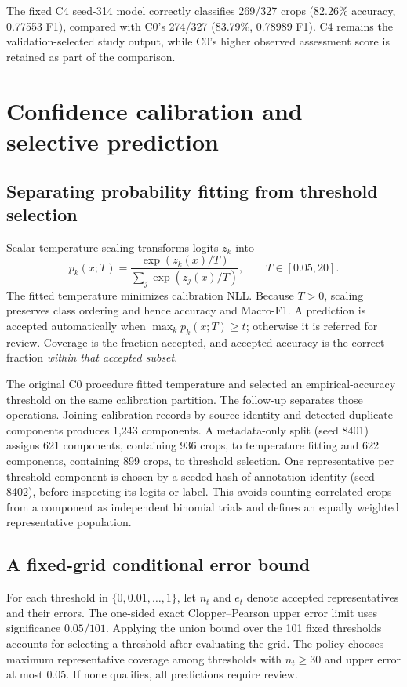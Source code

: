 The fixed C4 seed-314 model correctly classifies 269/327 crops (82.26\% accuracy, 0.77553 F1), compared with C0's 274/327 (83.79\%, 0.78989 F1). C4 remains the validation-selected study output, while C0's higher observed assessment score is retained as part of the comparison.

\clearpage
\section{Confidence calibration and selective prediction}
\subsection{Separating probability fitting from threshold selection}
Scalar temperature scaling \cite{temperature} transforms logits $z_k$ into
\[
p_k(x;T)=\frac{\exp(z_k(x)/T)}{\sum_j\exp(z_j(x)/T)},\qquad T\in[0.05,20].
\]
The fitted temperature minimizes calibration NLL. Because $T>0$, scaling preserves class ordering and hence accuracy and Macro-F1. A prediction is accepted automatically when $\max_k p_k(x;T)\ge t$; otherwise it is referred for review. Coverage is the fraction accepted, and accepted accuracy is the correct fraction \emph{within that accepted subset}.

The original C0 procedure fitted temperature and selected an empirical-accuracy threshold on the same calibration partition. The follow-up separates those operations. Joining calibration records by source identity and detected duplicate components produces 1,243 components. A metadata-only split (seed 8401) assigns 621 components, containing 936 crops, to temperature fitting and 622 components, containing 899 crops, to threshold selection. One representative per threshold component is chosen by a seeded hash of annotation identity (seed 8402), before inspecting its logits or label. This avoids counting correlated crops from a component as independent binomial trials and defines an equally weighted representative population.

\subsection{A fixed-grid conditional error bound}
For each threshold in $\{0,0.01,\ldots,1\}$, let $n_t$ and $e_t$ denote accepted representatives and their errors. The one-sided exact Clopper--Pearson upper error limit \cite{exactbinomial} uses significance $0.05/101$. Applying the union bound over the 101 fixed thresholds accounts for selecting a threshold after evaluating the grid. The policy chooses maximum representative coverage among thresholds with $n_t\ge30$ and upper error at most 0.05. If none qualifies, all predictions require review.

